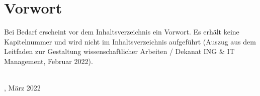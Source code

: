 \section*{Vorwort}
Bei Bedarf erscheint vor dem Inhaltsverzeichnis ein Vorwort. Es erhält keine Kapitelnummer und wird nicht im Inhaltsverzeichnis aufgeführt (Auszug aus dem Leitfaden zur Gestaltung wissenschaftlicher Arbeiten / Dekanat ING \& IT Management, Februar 2022).

\\[1cm]
{\myOrt}, März 2022

{\myAutor}